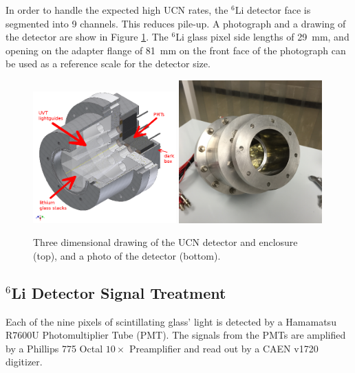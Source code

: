 \documentclass[letter,twocolumn,preprint,3p]{elsarticle}
\begin{document}
In order to handle the expected high UCN rates, the $^6$Li detector
face is segmented into 9 channels.  This reduces pile-up.  A
photograph and a drawing of the detector are show in Figure
\ref{fig:detdesigned}.  The ${^6}$Li glass pixel side lengths of
29~mm, and opening on the adapter flange of 81~mm on the front face of
the photograph can be used as a reference scale for the detector size.

\begin{figure}[!htpb] 
\includegraphics[width=0.49\textwidth]{figures/detdesigned.png} 
\includegraphics[width=0.49\textwidth]{figures/ucndet.png} 
\caption{\label{fig:detdesigned} Three dimensional drawing of the UCN
  detector and enclosure (top), and a photo of the detector (bottom).}
\end{figure} 

\subsection{$^6$Li Detector Signal Treatment}

Each of the nine pixels of scintillating glass' light is detected by a
Hamamatsu R7600U Photomultiplier Tube (PMT).  The signals from the
PMTs are amplified by a Phillips 775 Octal $10\times$ Preamplifier and
read out by a CAEN v1720 digitizer.
\end{document}
